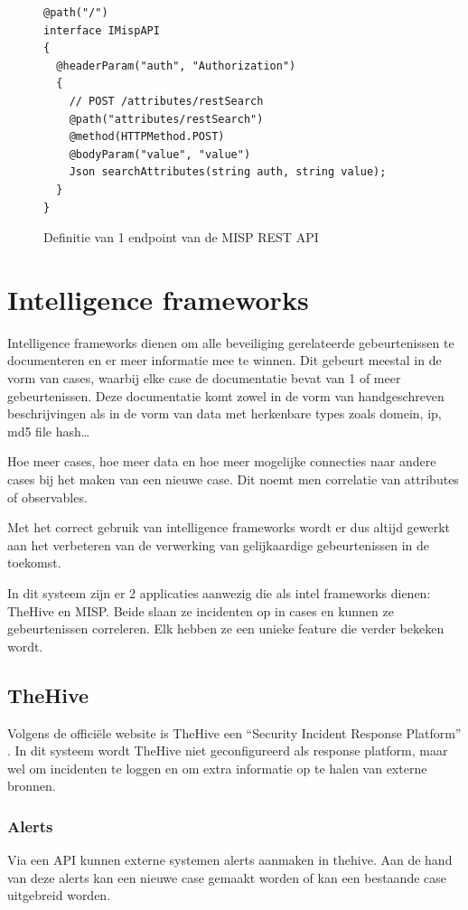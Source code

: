 \documentclass[a4paper, 12pt]{report}
\begin{document}
\begin{figure}[H]
  \begin{lstlisting}
@path("/")
interface IMispAPI
{
  @headerParam("auth", "Authorization")
  {
    // POST /attributes/restSearch
    @path("attributes/restSearch")
    @method(HTTPMethod.POST)
    @bodyParam("value", "value")
    Json searchAttributes(string auth, string value);
  }
}
  \end{lstlisting}
  \caption{Definitie van 1 endpoint van de MISP REST API}
  \label{fig:vibe-rest-misp}
\end{figure}

\section{Intelligence frameworks}
Intelligence frameworks dienen om alle beveiliging gerelateerde gebeurtenissen te documenteren en er meer informatie mee te winnen.
Dit gebeurt meestal in de vorm van cases, waarbij elke case de documentatie bevat van 1 of meer gebeurtenissen.
Deze documentatie komt zowel in de vorm van handgeschreven beschrijvingen als in de vorm van data met herkenbare types zoals domein, ip, md5 file hash\dots

Hoe meer cases, hoe meer data en hoe meer mogelijke connecties naar andere cases bij het maken van een nieuwe case.
Dit noemt men correlatie van attributes of observables.

Met het correct gebruik van intelligence frameworks wordt er dus altijd gewerkt aan het verbeteren van de verwerking van gelijkaardige gebeurtenissen in de toekomst.

In dit systeem zijn er 2 applicaties aanwezig die als intel frameworks dienen: TheHive en MISP.
Beide slaan ze incidenten op in cases en kunnen ze gebeurtenissen correleren.
Elk hebben ze een unieke feature die verder bekeken wordt.

\subsection{TheHive}
Volgens de officiële website is TheHive een ``Security Incident Response Platform'' \autocite{thehive:home}.
In dit systeem wordt TheHive niet geconfigureerd als response platform, maar wel om incidenten te loggen en om extra informatie op te halen van externe bronnen.

\subsubsection{Alerts}
Via een API kunnen externe systemen alerts aanmaken in thehive.
Aan de hand van deze alerts kan een nieuwe case gemaakt worden of kan een bestaande case uitgebreid worden.
\end{document}
